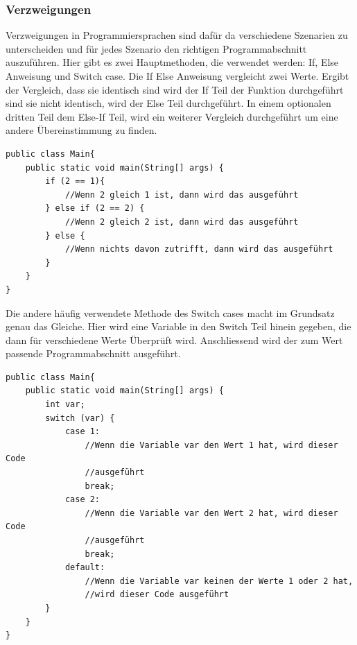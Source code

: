 \subsubsection{Verzweigungen}
Verzweigungen in Programmiersprachen sind dafür da verschiedene Szenarien zu unterscheiden und für jedes Szenario den richtigen Programmabschnitt auszuführen. Hier gibt es zwei Hauptmethoden, die verwendet werden: If, Else Anweisung und Switch case. Die If Else Anweisung vergleicht zwei Werte. Ergibt der Vergleich, dass sie identisch sind wird der If Teil der Funktion durchgeführt sind sie nicht identisch, wird der Else Teil durchgeführt. In einem optionalen dritten Teil dem Else-If Teil, wird ein weiterer Vergleich durchgeführt um eine andere Übereinstimmung zu finden.
\begin{verbatim}
public class Main{
    public static void main(String[] args) {
        if (2 == 1){
            //Wenn 2 gleich 1 ist, dann wird das ausgeführt
        } else if (2 == 2) {
            //Wenn 2 gleich 2 ist, dann wird das ausgeführt
        } else {
            //Wenn nichts davon zutrifft, dann wird das ausgeführt
        }
    }
}
\end{verbatim}
Die andere häufig verwendete Methode des Switch cases macht im Grundsatz genau das Gleiche. Hier wird eine Variable in den Switch Teil hinein gegeben, die dann für verschiedene Werte Überprüft wird. Anschliessend wird der zum Wert passende Programmabschnitt ausgeführt\cite{programmieren_lernen_java_2021}.
\begin{verbatim}
public class Main{
    public static void main(String[] args) {
        int var;
        switch (var) {
            case 1:
                //Wenn die Variable var den Wert 1 hat, wird dieser Code 
                //ausgeführt
                break;
            case 2:
                //Wenn die Variable var den Wert 2 hat, wird dieser Code 
                //ausgeführt
                break;
            default:
                //Wenn die Variable var keinen der Werte 1 oder 2 hat, 
                //wird dieser Code ausgeführt
        }
    }
}
\end{verbatim}

